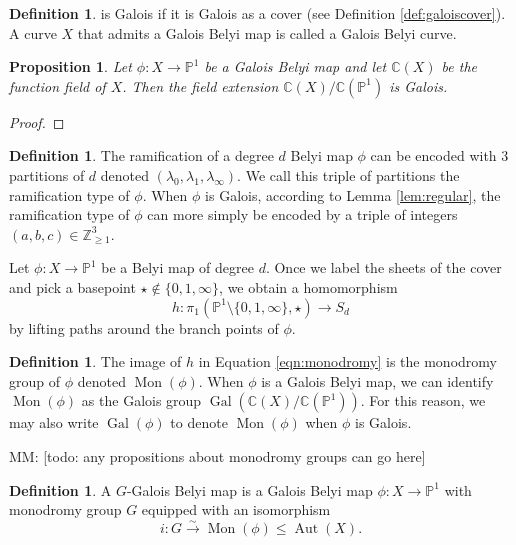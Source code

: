 \documentclass{dcthesis}
\newcommand{\PP}{\mathbb P}
\newcommand{\CC}{\mathbb C}
\newcommand{\ZZ}{\mathbb Z}
\newcommand{\defi}[1]{\textsf{#1}}
\newcommand{\mm}[1]{{\color{blue} \sf MM: [#1]}}
\DeclareMathOperator{\Aut}{Aut}
\DeclareMathOperator{\Mon}{Mon}
\DeclareMathOperator{\Gal}{Gal}
\numberwithin{equation}{section}
\newtheorem{prop}[equation]{Proposition}
\theoremstyle{definition}
\newtheorem{definition}[equation]{Definition}
\theoremstyle{remark}
\begin{document}
{{\begin{definition}
      is \defi{Galois}
      if it is Galois as a cover
      (see Definition \ref{def:galoiscover}).
      A curve $X$ that admits a Galois Belyi map
      is called a \defi{Galois Belyi curve}.
    \end{definition}
    \begin{prop}\label{prop:galoiscover}
      Let $\phi\colon X\to\PP^1$ be a Galois Belyi map
      and let $\CC(X)$ be the function field of $X$.
      Then the field extension
      $\CC(X)/\CC(\PP^1)$ is Galois.
    \end{prop}
    \begin{proof}
    \end{proof}
    \begin{definition}\label{def:ramificationtype}
      The ramification
      of a degree $d$ Belyi map $\phi$
      can be encoded with $3$ partitions of $d$
      denoted $(\lambda_0,\lambda_1,\lambda_\infty)$.
      We call this triple of partitions
      the \defi{ramification type} of $\phi$.
      When $\phi$ is Galois,
      according to Lemma \ref{lem:regular},
      the ramification type of $\phi$ can more simply be encoded by
      a triple of integers $(a,b,c)\in\ZZ_{\geq 1}^3$.
    \end{definition}
    Let $\phi\colon X\to\PP^1$ be a Belyi map of degree $d$.
    Once we label the sheets of the cover
    and pick a basepoint $\star\not\in\{0,1,\infty\}$,
    we obtain a homomorphism
    \begin{equation}\label{eqn:monodromy}
      h\colon\pi_1(\PP^1\setminus\{0,1,\infty\},\star)\to S_d
    \end{equation}
    by lifting paths around the branch points of $\phi$.
    \begin{definition}\label{def:monodromy}
      The image of $h$ in Equation \ref{eqn:monodromy}
      is the \defi{monodromy group} of $\phi$
      denoted $\Mon(\phi)$.
      When $\phi$ is a Galois Belyi map,
      we can identify $\Mon(\phi)$
      as the Galois group
      $\Gal(\CC(X)/\CC(\PP^1))$.
      For this reason,
      we may also write $\Gal(\phi)$
      to denote $\Mon(\phi)$ when $\phi$
      is Galois.
    \end{definition}
    \mm{todo: any propositions about monodromy groups can go here}
    \begin{definition}\label{def:Gbelyi}
      A \defi{$G$-Galois Belyi map}
      is a Galois Belyi map
      $\phi\colon X\to\PP^1$
      with monodromy group $G$
      equipped with an isomorphism
      \[
        i\colon G\stackrel{\sim}{\to}\Mon(\phi)\leq\Aut(X).
\]
\end{definition}}}
\end{document}
